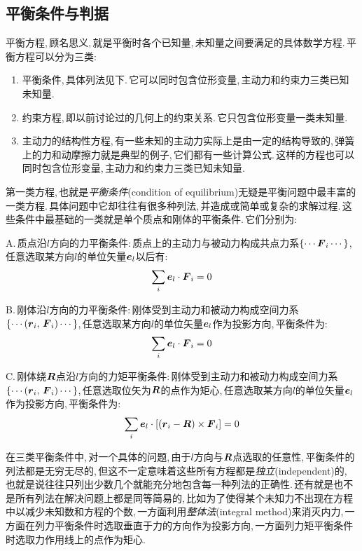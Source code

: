 \subsection{平衡条件与判据}

平衡方程,\,顾名思义,\,就是平衡时各个已知量,\,未知量之间要满足的具体数学方程.\,平衡方程可以分为三类:
\begin{enumerate}
  \item 平衡条件,\,具体列法见下.\,它可以同时包含位形变量,\,主动力和约束力三类已知未知量.
  \item 约束方程,\,即以前讨论过的几何上的约束关系.\,它只包含位形变量一类未知量.
  \item 主动力的结构性方程,\,有一些未知的主动力实际上是由一定的结构导致的,\,弹簧上的力和动摩擦力就是典型的例子,\,它们都有一些计算公式.\,这样的方程也可以同时包含位形变量,\,主动力和约束力三类已知未知量.
\end{enumerate}

第一类方程,\,也就是\emph{平衡条件}(condition of equilibrium)无疑是平衡问题中最丰富的一类方程.\,具体问题中它却往往有很多种列法,\,并造成或简单或复杂的求解过程.\,这些条件中最基础的一类就是单个质点和刚体的平衡条件.\,它们分别为:
\vspace{1cm}

A.\,质点沿$l$方向的力平衡条件:\,质点上的主动力与被动力构成共点力系$\{\cdots\boldsymbol{F}_i\cdots\}$,\,任意选取某方向$l$的单位矢量$\boldsymbol{e}_l$以后有:
\[\sum_i\boldsymbol{e}_l\cdot\boldsymbol{F}_i=0\]

B.\,刚体沿$l$方向的力平衡条件:\,刚体受到主动力和被动力构成空间力系$\{\cdots(\boldsymbol{r}_i,\,\boldsymbol{F}_i)\cdots\}$,\,任意选取某方向$l$的单位矢量$\boldsymbol{e}_l$作为投影方向,\,平衡条件为:
\[\sum_i\boldsymbol{e}_l\cdot\boldsymbol{F}_i=0\]

C.\,刚体绕$\boldsymbol{R}$点沿$l$方向的力矩平衡条件:\,刚体受到主动力和被动力构成空间力系$\{\cdots(\boldsymbol{r}_i,\,\boldsymbol{F}_i)\cdots\}$,\,任意选取位矢为$\boldsymbol{R}$的点作为矩心,\,任意选取某方向$l$的单位矢量$\boldsymbol{e}_l$作为投影方向,\,平衡条件为:
\[\sum_i\boldsymbol{e}_l\cdot[(\boldsymbol{r}_i-\boldsymbol{R})\times\boldsymbol{F}_i]=0\]

\vspace{1cm}
在三类平衡条件中,\,对一个具体的问题,\,由于$l$方向与$\boldsymbol{R}$点选取的任意性,\,平衡条件的列法都是无穷无尽的,\,但这不一定意味着这些所有方程都是\emph{独立}(independent)的,\,也就是说往往只列出少数几个就能充分地包含每一种列法的正确性.\,还有就是也不是所有列法在解决问题上都是同等简易的,\,比如为了使得某个未知力不出现在方程中以减少未知数和方程的个数,\,一方面利用\emph{整体法}(integral method)来消灭内力,\,一方面在列力平衡条件时选取垂直于力的方向作为投影方向,\,一方面列力矩平衡条件时选取力作用线上的点作为矩心.

